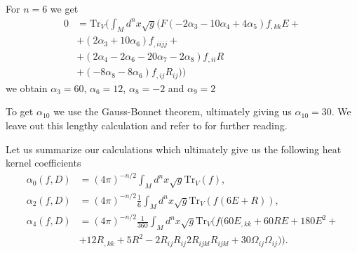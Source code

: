 For $n=6$ we get
\begin{align}
    0 &= \text{Tr}_V(\int_Md^nx\sqrt{g}
    (F(-2\alpha_3-10\alpha_4+4\alpha_5)f_{,kk}E +\nonumber\\
    &+(2\alpha_3 + 10\alpha_6)f_{,iijj}+\nonumber\\
    &+(2\alpha_4 -2\alpha_6 - 20\alpha_7 -2\alpha_8)f_{,ii}R\nonumber\\
    &+(-8\alpha_8 -8\alpha_6)f_{,ij}R_{ij}))
\end{align}
we obtain $\alpha_3 = 60$, $\alpha_6=12$, $\alpha_8 = -2$ and $\alpha_9 = 2$

To get $\alpha_{10}$ we use the Gauss-Bonnet theorem, ultimately giving us
$\alpha_{10}=30$. We leave out this lengthy calculation and refer to
\cite{heatkernel} for further reading.

Let us summarize our calculations which ultimately give us the following heat kernel
coefficients
\begin{align}
    \alpha_0(f, D) &= (4\pi)^{-n/2}\int_M d^n x \sqrt{g} \text{Tr}_V(f),\\
    \alpha_2(f, D) &= (4\pi)^{-n/2}\frac{1}{6}\int_M d^n x \sqrt{g}
    \text{Tr}_V(f(6E+R)),\\
    \alpha_4(f, D) &= (4\pi)^{-n/2}\frac{1}{360}\int_M d^n x \sqrt{g}
    \text{Tr}_V(f(60E_{,kk}+60RE+ 180E^2 +\\
    &+12R_{,kk} + 5R^2 - 2 R_{ij}R_{ij}
    2R_{ijkl}R_{ijkl} +30\Omega_{ij}\Omega_{ij})).
\end{align}

